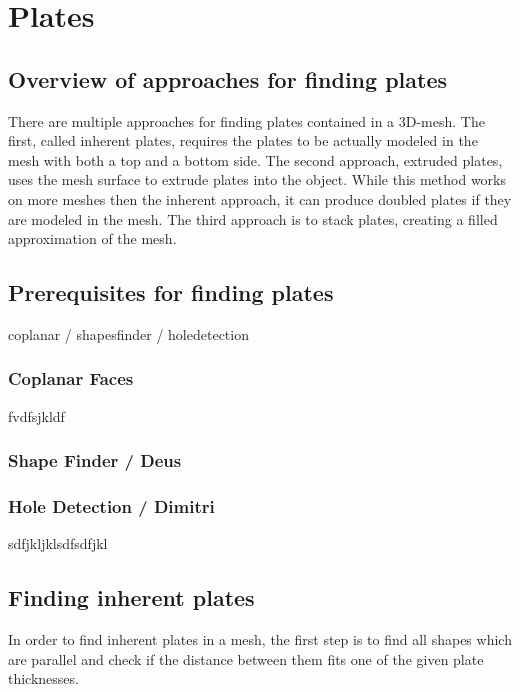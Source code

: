\documentclass[../ClassicThesis.tex]{subfiles}
\begin{document}
\chapter{Plates}\label{ch:plates}

\section{Overview of approaches for finding plates}

There are multiple approaches for finding plates contained in a 3D-mesh. The first, called inherent plates, requires the plates to be actually modeled in the mesh with both a top and a bottom side. The second approach, extruded plates, uses the mesh surface to extrude plates into the object. While this method works on more meshes then the inherent approach, it can produce doubled plates if they are modeled in the mesh. The third approach is to stack plates, creating a filled approximation of the mesh.

\section{Prerequisites for finding plates}

coplanar / shapesfinder / holedetection

\subsection{Coplanar Faces}

fvdfsjkldf

\subsection{Shape Finder / Deus}



\subsection{Hole Detection / Dimitri}

sdfjkljklsdfsdfjkl

\section{Finding inherent plates}

In order to find inherent plates in a mesh, the first step is to find all shapes which are parallel and check if the distance between them fits one of the given plate thicknesses.
\end{document}
